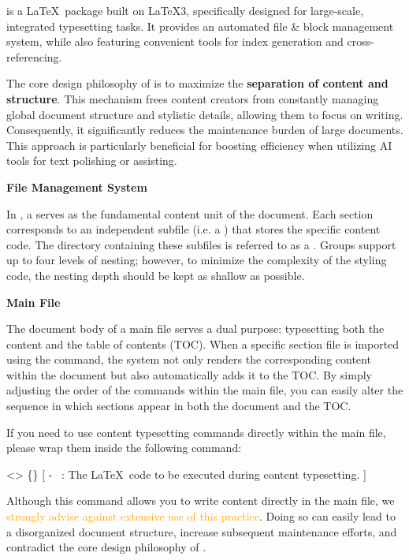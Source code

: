 
\SimpleSystemTeX is a \LaTeX\ package built on \LaTeX3, specifically designed for large-scale, integrated typesetting tasks. It provides an automated file \& block management system, while also featuring convenient tools for index generation and cross-referencing.

The core design philosophy of \SimpleSystemTeX is to maximize the \textbf{separation of content and structure}. This mechanism frees content creators from constantly managing global document structure and stylistic details, allowing them to focus on writing. Consequently, it significantly reduces the maintenance burden of large documents. This approach is particularly beneficial for boosting efficiency when utilizing AI tools for text polishing or assisting.

\medskip\textbf{File Management System}

In \SimpleSystemTeX, a  serves as the fundamental content unit of the document. Each section corresponds to an independent subfile (i.e. a ) that stores the specific content code. The directory containing these subfiles is referred to as a . Groups support up to four levels of nesting; however, to minimize the complexity of the styling code, the nesting depth should be kept as shallow as possible.

\medskip\textbf{Main File}

The document body of a \SimpleSystemTeX main file serves a dual purpose: typesetting both the content and the table of contents (TOC). When a specific section file is imported using the  command, the system not only renders the corresponding content within the document but also automatically adds it to the TOC. By simply adjusting the order of the  commands within the main file, you can easily alter the sequence in which sections appear in both the document and the TOC.

If you need to use content typesetting commands directly within the main file, please wrap them inside the following command:

<>{
    \{\longarg\}
}[
    - \longarg\ : The \LaTeX\ code to be executed during content typesetting.
]

Although this command allows you to write content directly in the main file, we \textcolor{orange}{strongly advise against extensive use of this practice}. Doing so can easily lead to a disorganized document structure, increase subsequent maintenance efforts, and contradict the core design philosophy of \SimpleSystemTeX.

